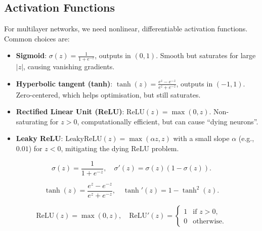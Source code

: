 \documentclass{tufte-handout}
\begin{document}
\begin{marginfigure}
\caption{2D Contour Optimization}
\label{fig:contour_2d}
\end{marginfigure}


\subsection{Activation Functions}

For multilayer networks, we need nonlinear, differentiable activation functions. Common choices are:

\begin{itemize}
    \item \textbf{Sigmoid}: $\sigma(z) = \frac{1}{1+e^{-z}}$, outputs in $(0,1)$. Smooth but saturates for large $|z|$, causing vanishing gradients.
    \item \textbf{Hyperbolic tangent (tanh)}: $\tanh(z) = \frac{e^{z}-e^{-z}}{e^{z}+e^{-z}}$, outputs in $(-1,1)$. Zero-centered, which helps optimisation, but still saturates.
    \item \textbf{Rectified Linear Unit (ReLU)}: $\text{ReLU}(z) = \max(0,z)$. Non-saturating for $z>0$, computationally efficient, but can cause “dying neurons”.
    \item \textbf{Leaky ReLU}: $\text{LeakyReLU}(z) = \max(\alpha z, z)$ with a small slope $\alpha$ (e.g., $0.01$) for $z<0$, mitigating the dying ReLU problem.
\end{itemize}

\begin{defn}[Sigmoid]
    \[
    \sigma(z) = \frac{1}{1+e^{-z}},\quad \sigma'(z) = \sigma(z)(1-\sigma(z)).
    \]
\end{defn}
\begin{defn}
    \[
    \tanh(z) = \frac{e^{z}-e^{-z}}{e^{z}+e^{-z}},\quad \tanh'(z) = 1 - \tanh^2(z).
    \]
\end{defn}
\begin{defn}
    \[
    \text{ReLU}(z) = \max(0,z),\quad \text{ReLU}'(z) = \begin{cases} 1 & \text{if } z>0,\\ 0 & \text{otherwise.} \end{cases}
    \]
\end{defn}
\end{document}
